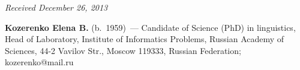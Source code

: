 \begin{multicols}{2}
{{\begin{thebibliography}{99}
\end{thebibliography}
} }


\end{multicols}

\vspace*{-6pt}


\hfill{\small\textit{Received December 26, 2013}}

\vspace*{-18pt}

\Contrl

\noindent
\textbf{Kozerenko Elena B.} (b.\ 1959)~--- Candidate of Science (PhD) in linguistics,
Head of Laboratory, Institute of Informatics Problems, Russian
Academy of Sciences, 44-2 Vavilov Str., Moscow 119333, Russian Federation;
kozerenko@mail.ru




 \label{end\stat}
 
\renewcommand{\bibname}{\protect\rm Литература}